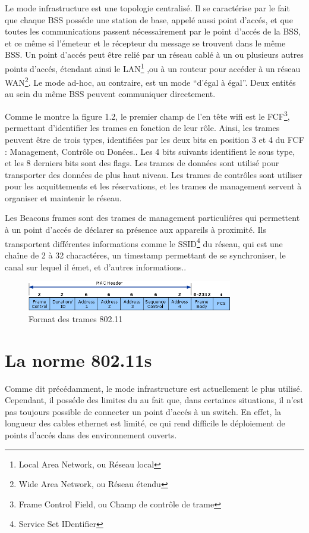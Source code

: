 Le mode infrastructure est une topologie centralisé. Il se caractérise par le fait que chaque BSS posséde une station de
base, appelé aussi point d'accés, et que toutes les communications passent nécessairement par le point d'accés de la BSS,
et ce même si l'émeteur et le récepteur du message se trouvent dans le même BSS. Un point d'accés peut être relié par un réseau
cablé à un ou plusieurs autres points d'accés, étendant ainsi le LAN\footnote{Local Area Network, ou Réseau local}
\cite{WFfunc},ou à un routeur pour accéder à un réseau WAN\footnote{Wide Area Network, ou Réseau étendu}.
Le mode ad-hoc, au contraire, est un mode ``d'égal à égal''. Deux entités au sein du même BSS peuvent communiquer directement.


Comme le montre la figure 1.2\cite{WFhead}, le premier champ de l'en tête wifi est le FCF\footnote{Frame Control Field, ou Champ
de contrôle de trame}, permettant d'identifier les trames en fonction de leur rôle. Ainsi, les trames peuvent être de trois types,
identifiées par les deux bits en position 3 et 4 du FCF : Management, Contrôle ou Donées.\cite{WFfcf}. Les 4 bits suivants
identifient le sous type, et les 8 derniers bits sont des flags. Les trames de données sont utilisé pour transporter des données
de plus haut niveau. Les trames de contrôles sont utiliser pour les acquittements et les réservations, et les trames de management
servent à organiser et maintenir le réseau\cite{MNfunc}.

Les Beacons frames sont des trames de management particuliéres qui permettent à un point d'accés de déclarer sa présence aux
appareils à proximité. Ils transportent différentes informations comme le SSID\footnote{Service Set IDentifier} du réseau,
qui est une chaîne de 2 à 32 charactéres, un timestamp permettant de se synchroniser, le canal sur lequel il émet, 
et d'autres informations.\cite{WFfunc2}.
\begin{figure}
   \centering
   \includegraphics[width=0.8\textwidth,natwidth=488,natheight=513]{images/header_wifi.png}
   \caption{Format des trames 802.11}
\end{figure}

\section{La norme 802.11s}
Comme dit précédamment, le mode infrastructure est actuellement le plus utilisé. Cependant, il posséde des limites du au fait
que, dans certaines situations, il n'est pas toujours possible de connecter un point d'accés à un switch\cite{MNintro}.
En effet, la longueur des cables ethernet est limité, ce qui rend difficile le déploiement de points d'accés dans des
environnement ouverts.

